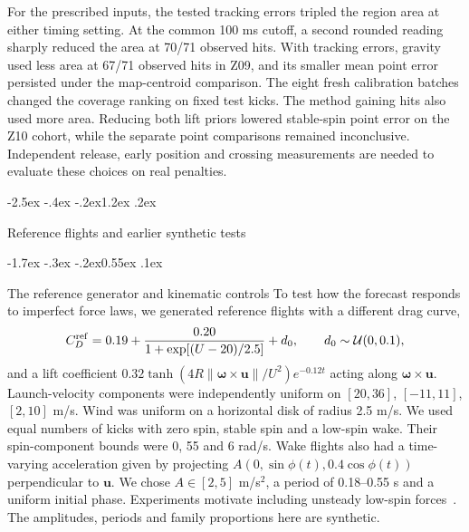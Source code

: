 \documentclass[11pt,letterpaper]{article}
\makeatletter
\renewcommand{\section}{\reserveheadroom\@startsection{section}{1}{\z@}
  {-2.5ex \@plus -.4ex \@minus -.2ex}{1.2ex \@plus .2ex}
  {\normalfont\Large\bfseries\color{black}\raggedright}}
\renewcommand{\subsection}{\reserveheadroom\@startsection{subsection}{2}{\z@}
  {-1.7ex \@plus -.3ex \@minus -.2ex}{0.55ex \@plus .1ex}
  {\normalfont\normalsize\sffamily\bfseries\color{black}\raggedright}}
\renewcommand{\@seccntformat}[1]{\csname the#1\endcsname\hspace{.65em}}
\newcommand{\vv}[1]{\boldsymbol{#1}}
\newcommand{\norm}[1]{\lVert #1\rVert}
\newcommand{\reserveheadroom}{\par\ifdim\dimexpr\pagegoal-\pagetotal\relax<5\baselineskip\newpage\fi}
\makeatother
\begin{document}
For the prescribed inputs, the tested tracking errors tripled the region area at either timing setting. At the common 100 ms cutoff, a second rounded reading sharply reduced the area at 70/71 observed hits. With tracking errors, gravity used less area at 67/71 observed hits in Z09, and its smaller mean point error persisted under the map-centroid comparison. The eight fresh calibration batches changed the coverage ranking on fixed test kicks. The method gaining hits also used more area. Reducing both lift priors lowered stable-spin point error on the Z10 cohort, while the separate point comparisons remained inconclusive. Independent release, early position and crossing measurements are needed to evaluate these choices on real penalties.

\clearpage
\appendix
\makeatletter
\def\section@appendixprefix{Appendix~}
\renewcommand{\@seccntformat}[1]{\csname #1@appendixprefix\endcsname\csname the#1\endcsname\hspace{.55em}}
\makeatother


\section{Reference flights and earlier synthetic tests}
\label{app:reference}
\label{sec:tests}

\subsection{The reference generator and kinematic controls}
To test how the forecast responds to imperfect force laws, we generated reference flights with a different drag curve,
\[
 C_D^{\rm ref}=0.19+\frac{0.20}{1+\exp[(U-20)/2.5]}+d_0,
 \qquad d_0\sim\mathcal U(0,0.1),
\]
and a lift coefficient \(0.32\tanh(4R\norm{\vv\omega\times\vv u}/U^2)e^{-0.12t}\) acting along \(\vv\omega\times\vv u\). Launch-velocity components were independently uniform on \([20,36]\), \([-11,11]\), \([2,10]\) m/s. Wind was uniform on a horizontal disk of radius 2.5 m/s. We used equal numbers of kicks with zero spin, stable spin and a low-spin wake. Their spin-component bounds were 0, 55 and 6 rad/s. Wake flights also had a time-varying acceleration given by projecting \(A(0,\sin\phi(t),0.4\cos\phi(t))\) perpendicular to \(\vv u\). We chose \(A\in[2,5]\) m/s\(^2\), a period of 0.18--0.55 s and a uniform initial phase. Experiments motivate including unsteady low-spin forces~\cite{mizota}. The amplitudes, periods and family proportions here are synthetic.
\end{document}
